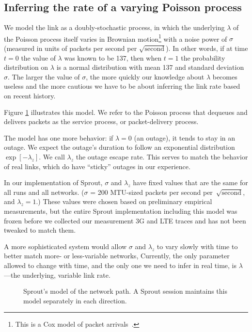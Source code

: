\subsection{Inferring the rate of a varying Poisson process}

We model the link as a doubly-stochastic process, in which the
underlying $\lambda$ of the Poisson process itself varies in Brownian
motion\footnote{This is a Cox model of packet
  arrivals~\cite{Cox84,Paxson95}.} with a noise power of $\sigma$
(measured in units of packets per second per
$\sqrt{\mbox{second}}$). In other words, if at time $t = 0$ the value
of $\lambda$ was known to be 137, then when $t = 1$ the probability
distribution on $\lambda$ is a normal distribution with mean 137 and
standard deviation $\sigma$.  The larger the value of $\sigma$, the
more quickly our knowledge about $\lambda$ becomes useless and the
more cautious we have to be about inferring the link rate based on
recent history.

Figure \ref{f:sprout-model} illustrates this model. We refer to the
Poisson process that dequeues and delivers packets as the service
process, or packet-delivery process.

The model has one more behavior: if $\lambda = 0$ (an outage), it
tends to stay in an outage. We expect the outage's duration to follow
an exponential distribution $\exp\left[-\lambda_z\right]$. We call
$\lambda_z$ the outage escape rate. This serves to match the behavior
of real links, which do have ``sticky'' outages in our experience.

In our implementation of Sprout, $\sigma$ and $\lambda_z$ have fixed
values that are the same for all runs and all networks. ($\sigma$ =
200 MTU-sized packets per second per~$\sqrt{\mbox{second}}$, and $\lambda_z =
1$.) These values were chosen based on preliminary empirical
measurements, but the entire Sprout implementation including this
model was frozen before we collected our measurement 3G and LTE traces
and has not been tweaked to match them.

A more sophisticated system would allow $\sigma$ and $\lambda_z$ to
vary slowly with time to better match more- or less-variable networks,
Currently, the only parameter allowed to change with time, and the
only one we need to infer in real time, is $\lambda$---the underlying,
variable link rate.

\begin{figure}
  \caption{Sprout's model of the network path. A Sprout session
    maintains this model separately in each direction.}

\hspace{\baselineskip}

\noindent \def\svgwidth{\columnwidth}

\label{f:sprout-model}

\end{figure}


